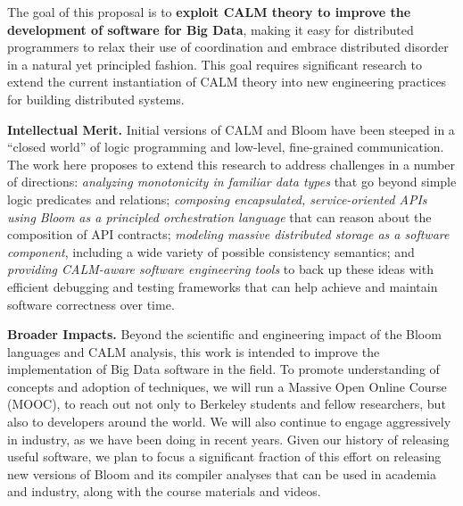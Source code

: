 The goal of this proposal is to \textbf{exploit CALM theory to improve the development of software for Big Data}, making it easy for distributed programmers to relax their use of coordination and embrace distributed disorder in a natural yet principled fashion.  This goal requires significant research to extend the current instantiation of CALM theory into new engineering practices for building distributed systems.  


\vspace{6pt}
\noindent \textbf{Intellectual Merit.} Initial versions of CALM and Bloom have been steeped in a ``closed world'' of logic programming and low-level, fine-grained communication.  The work here proposes to extend this research to address challenges in a number of directions: \emph{analyzing monotonicity in familiar data types} that go beyond simple logic predicates and relations; \emph{composing encapsulated, service-oriented APIs using Bloom as a principled orchestration language} that can reason about the composition of API contracts; \emph{modeling massive distributed storage as a software component}, including a wide variety of possible consistency semantics; and \emph{providing CALM-aware software engineering tools} to back up these ideas with efficient debugging and testing frameworks that can help achieve and maintain software correctness over time.
 
\vspace{6pt}
\noindent \textbf{Broader Impacts.} Beyond the scientific and engineering impact of the Bloom languages and CALM analysis, this work is intended to improve the implementation of Big Data software in the field.  To promote understanding of concepts and adoption of techniques, we will run a Massive Open Online Course (MOOC), to reach out not only to Berkeley students and fellow researchers, but also to developers around the world. We will also continue to engage aggressively in industry, as we have been doing in recent years.  Given our history of releasing useful software, we plan to focus a significant fraction of this effort on releasing new versions of Bloom and its compiler analyses that can be used in academia and industry, along with the course materials and videos.


